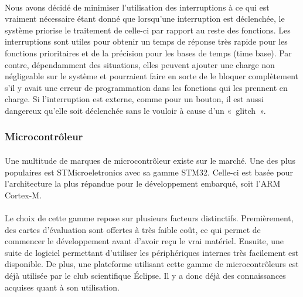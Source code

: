 		\paragraph*{}
		Nous avons décidé de minimiser l’utilisation des interruptions à ce qui est vraiment nécessaire étant donné que lorsqu’une interruption est déclenchée, le système priorise le traitement de celle-ci par rapport au reste des fonctions. Les interruptions sont utiles pour obtenir un temps de réponse très rapide pour les fonctions prioritaires et de la précision pour les bases de temps (time base). Par contre, dépendamment des situations, elles peuvent ajouter une charge non négligeable sur le système et pourraient faire en sorte de le bloquer complètement s’il y avait une erreur de programmation dans les fonctions qui les prennent en charge. Si l’interruption est externe, comme pour un bouton, il est aussi dangereux qu’elle soit déclenchée sans le vouloir à cause d’un « glitch ».

	\subsubsection*{Microcontrôleur}
		\paragraph*{}
		Une multitude de marques de microcontrôleur existe sur le marché. Une des plus populaires est STMicroeletronics avec sa gamme STM32. Celle-ci est basée pour l’architecture la plus répandue pour le développement embarqué, soit l’ARM Cortex-M.

		\paragraph*{}
		Le choix de cette gamme repose sur plusieurs facteurs distinctifs. Premièrement, des cartes d’évaluation sont offertes à très faible coût, ce qui permet de commencer le développement avant d’avoir reçu le vrai matériel. Ensuite, une suite de logiciel permettant d’utiliser les périphériques internes très facilement est disponible. De plus, une plateforme utilisant cette gamme de microcontrôleurs est déjà utilisée par le club scientifique Éclipse. Il y a donc déjà des connaissances acquises quant à son utilisation.
